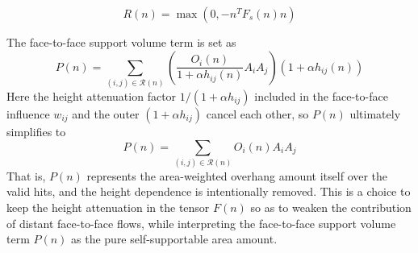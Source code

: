 \documentclass[11pt,a4paper]{article}
\begin{document}
\begin{equation}
R(n)=\max\left(0,-n^TF_s(n)n\right)
\end{equation}

The face-to-face support volume term is set as
\begin{equation}
P(n)
=
\sum_{(i,j)\in\mathcal{R}(n)}
\left(
\frac{O_i(n)}{1+\alpha h_{ij}(n)}A_iA_j
\right)
\left(1+\alpha h_{ij}(n)\right)
\end{equation}
Here the height attenuation factor $1/(1+\alpha h_{ij})$ included in the face-to-face influence $w_{ij}$ and the outer $(1+\alpha h_{ij})$ cancel each other,
so $P(n)$ ultimately simplifies to
\begin{equation}
P(n)
=
\sum_{(i,j)\in\mathcal{R}(n)}
O_i(n)A_iA_j
\end{equation}
That is, $P(n)$ represents the area-weighted overhang amount itself over the valid hits,
and the height dependence is intentionally removed.
This is a choice to keep the height attenuation in the tensor $F(n)$ so as to weaken the contribution of distant face-to-face flows,
while interpreting the face-to-face support volume term $P(n)$ as the pure self-supportable area amount.
\end{document}

